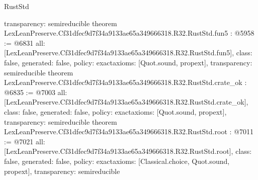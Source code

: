 \begin{lexlean}{RustStd}
\begin{coremodule}
{  transparency: semireducible
}
theorem LexLeanPreserve.Cf31dfec9d7f34a9133ae65a349666318.R32.RustStd.fun5 : @5958 := @6831 {
  all: [LexLeanPreserve.Cf31dfec9d7f34a9133ae65a349666318.R32.RustStd.fun5],
  class: false,
  generated: false,
  policy: exact{axioms: [Quot.sound, propext]},
  transparency: semireducible
}
theorem LexLeanPreserve.Cf31dfec9d7f34a9133ae65a349666318.R32.RustStd.crate_ok : @6835 := @7003 {
  all: [LexLeanPreserve.Cf31dfec9d7f34a9133ae65a349666318.R32.RustStd.crate_ok],
  class: false,
  generated: false,
  policy: exact{axioms: [Quot.sound, propext]},
  transparency: semireducible
}
theorem LexLeanPreserve.Cf31dfec9d7f34a9133ae65a349666318.R32.RustStd.root : @7011 := @7021 {
  all: [LexLeanPreserve.Cf31dfec9d7f34a9133ae65a349666318.R32.RustStd.root],
  class: false,
  generated: false,
  policy: exact{axioms: [Classical.choice, Quot.sound, propext]},
  transparency: semireducible
}


\end{coremodule}
\end{lexlean}
